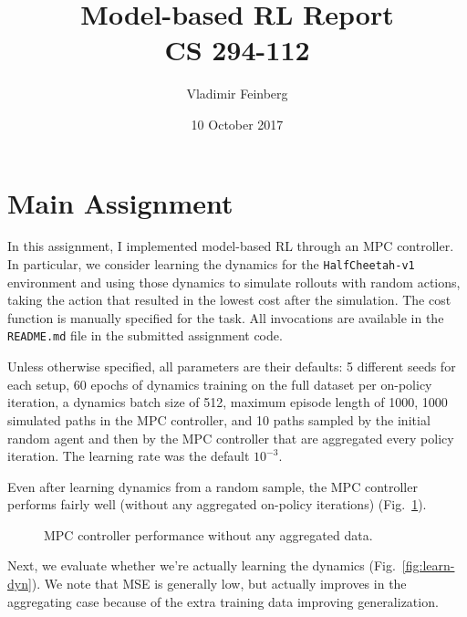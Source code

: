 \documentclass{article}
\title{Model-based RL Report\\\large CS 294-112}
\author{Vladimir Feinberg}
\date{10 October 2017}
\begin{document}
	
\maketitle

\section{Main Assignment}

In this assignment, I implemented model-based RL through an MPC controller. In particular, we consider learning the dynamics for the \texttt{HalfCheetah-v1} environment and using those dynamics to simulate rollouts with random actions, taking the action that resulted in the lowest cost after the simulation. The cost function is manually specified for the task. All invocations are available in the \texttt{README.md} file in the submitted assignment code.

Unless otherwise specified, all parameters are their defaults: 5 different seeds for each setup, 60 epochs of dynamics training on the full dataset per on-policy iteration, a dynamics batch size of 512, maximum episode length of 1000, 1000 simulated paths in the MPC controller, and 10 paths sampled by the initial random agent and then by the MPC controller that are aggregated every policy iteration. The learning rate was the default $10^{-3}$.

Even after learning dynamics from a random sample, the MPC controller performs fairly well (without any aggregated on-policy iterations) (Fig.~\ref{fig:oneit}).

\begin{figure}[!h]
  \begin{center}
\theverbbox
  \end{center}
  \caption{MPC controller performance without any aggregated data.}
\label{fig:oneit}
\end{figure}

\FloatBarrier

Next, we evaluate whether we're actually learning the dynamics (Fig.~\ref{fig:learn-dyn}). We note that MSE is generally low, but actually improves in the aggregating case because of the extra training data improving generalization.
\end{document}
